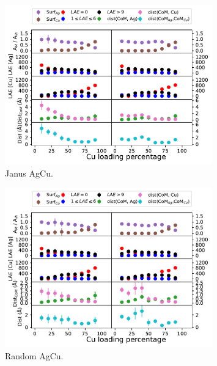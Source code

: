 \begin{figure}
    \centering
    \includegraphics[width=0.8\textwidth]{figures/MD/Alloys/Janus_Ag-Cu.pdf}
    \caption{Janus AgCu.}
    \label{fig:AgCuJan_Dyn}
\end{figure}

\begin{figure}
    \centering
    \includegraphics[width=0.8\textwidth]{figures/MD/Alloys/Random_Ag-Cu.pdf}
    \caption{Random AgCu.}
    \label{fig:AgCuRnd_Dyn}
\end{figure}

